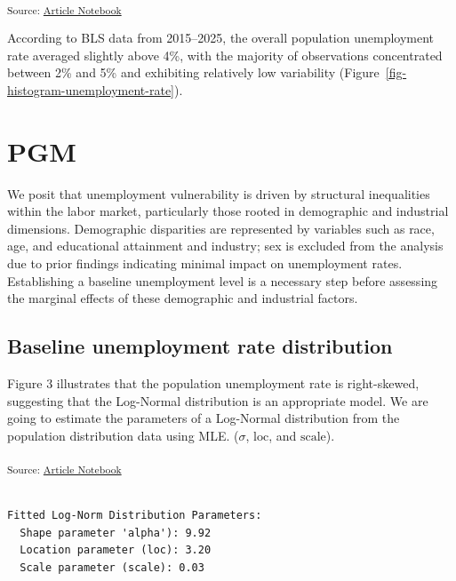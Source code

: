 \documentclass[
]{agujournal2019}
\begin{document}
\textsubscript{Source:
\href{https://mw1296.github.io/dsan5650_social_causal_inference/index.qmd.html}{Article
Notebook}}

According to BLS data from 2015--2025, the overall population
unemployment rate averaged slightly above 4\%, with the majority of
observations concentrated between 2\% and 5\% and exhibiting relatively
low variability (Figure~\ref{fig-histogram-unemployment-rate}).

\section{PGM}\label{pgm}

We posit that unemployment vulnerability is driven by structural
inequalities within the labor market, particularly those rooted in
demographic and industrial dimensions. Demographic disparities are
represented by variables such as race, age, and educational attainment
and industry; sex is excluded from the analysis due to prior findings
indicating minimal impact on unemployment rates. Establishing a baseline
unemployment level is a necessary step before assessing the marginal
effects of these demographic and industrial factors.

\subsection{Baseline unemployment rate
distribution}\label{baseline-unemployment-rate-distribution}

Figure 3 illustrates that the population unemployment rate is
right-skewed, suggesting that the Log-Normal distribution is an
appropriate model. We are going to estimate the parameters of a
Log-Normal distribution from the population distribution data using MLE.
(\(\sigma\), \(\text{loc}\), and \(\text{scale}\)).

\textsubscript{Source:
\href{https://mw1296.github.io/dsan5650_social_causal_inference/index.qmd.html}{Article
Notebook}}

\begin{verbatim}

Fitted Log-Norm Distribution Parameters:
  Shape parameter 'alpha'): 9.92
  Location parameter (loc): 3.20
  Scale parameter (scale): 0.03
\end{verbatim}
\end{document}
